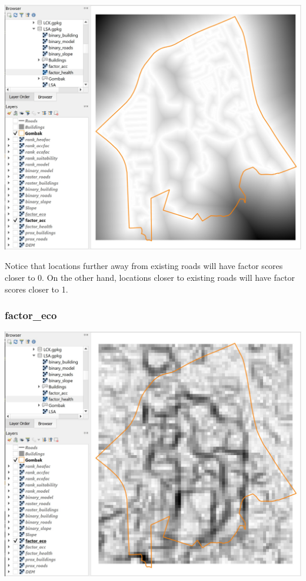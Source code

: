 \documentclass[
  letterpaper,
  DIV=11,
  numbers=noendperiod]{scrreprt}
\begin{document}
\includegraphics{./img08/image15.jpg}

Notice that locations further away from existing roads will have factor
scores closer to 0. On the other hand, locations closer to existing
roads will have factor scores closer to 1.

\hypertarget{factor_eco}{%
\subsubsection{factor\_eco}\label{factor_eco}}

\includegraphics{./img08/image16.jpg}
\end{document}
